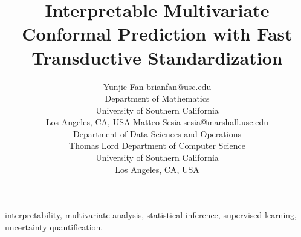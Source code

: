 \documentclass[11pt]{article}
\begin{document}

\title{Interpretable Multivariate Conformal Prediction with Fast Transductive Standardization}

\author{\name Yunjie Fan \email brianfan@usc.edu \\
       \addr Department of Mathematics\\
       University of Southern California\\
       Los Angeles, CA, USA
       \AND
       \name Matteo Sesia \email sesia@marshall.usc.edu \\
       \addr Department of Data Sciences and Operations\\
       {Thomas Lord Department of Computer Science\\
       University of Southern California\\
       Los Angeles, CA, USA}
}

\maketitle

\begin{abstract}%

\end{abstract}

\begin{keywords}
interpretability, multivariate analysis, statistical inference, supervised learning, uncertainty quantification.
\end{keywords}



 

\newpage

\appendix

\end{document}
